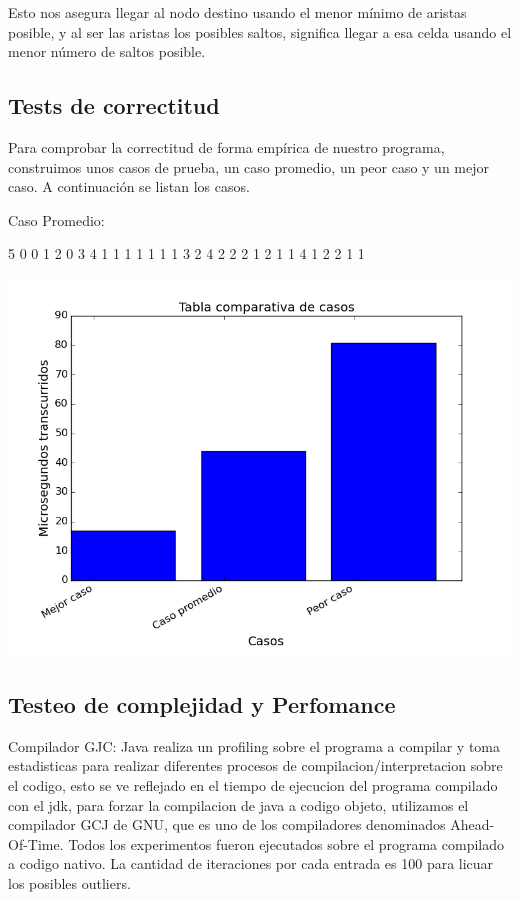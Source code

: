 \vspace{2mm}

Esto nos asegura llegar al nodo destino usando el menor m\'inimo de aristas posible, y al ser las aristas los posibles saltos, significa llegar a esa celda usando el menor n\'umero de saltos posible.



\subsection{Tests de correctitud}

Para comprobar la correctitud de forma emp\'irica de nuestro programa, construimos unos casos de prueba, un caso promedio, un peor caso y un mejor caso. A continuaci\'on se listan los casos.

Caso Promedio:

5 0 0 1 2 0
3 4 1 1 1
1 1 1 1 3
2 4 2 2 2
1 2 1 1 4
1 2 2 1 1

\begin{center}
\includegraphics[scale=0.5]{images/casosej3}
\end{center}

\subsection{Testeo de complejidad y Perfomance}
Compilador GJC: Java realiza un profiling sobre el programa a compilar y toma estadisticas para realizar diferentes procesos de compilacion/interpretacion sobre el codigo, esto se ve reflejado en el tiempo de ejecucion del programa compilado con el jdk, para forzar la compilacion de java a codigo objeto, utilizamos el compilador GCJ de GNU, que es uno de los compiladores denominados Ahead-Of-Time. Todos los experimentos fueron ejecutados sobre el programa compilado a codigo nativo. La cantidad de iteraciones por cada entrada es 100 para licuar los posibles outliers.

